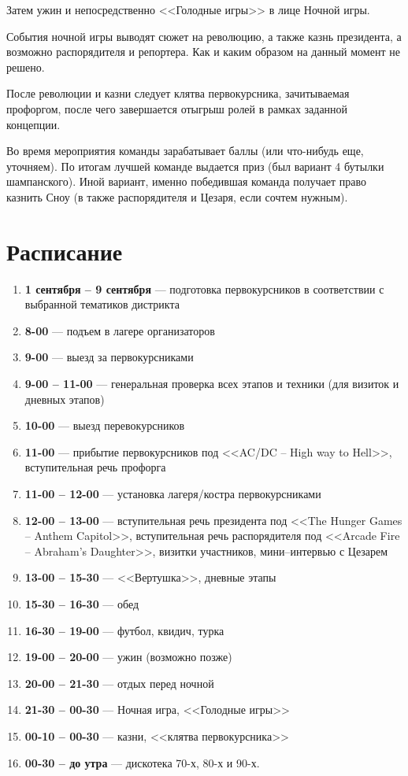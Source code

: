 \documentclass[a4paper, 14pt]{extarticle}
\theoremstyle{definition}
\begin{document}
\par Затем ужин и непосредственно <<Голодные игры>> в лице Ночной игры.

\par События ночной игры выводят сюжет на революцию, а также казнь президента, а возможно распорядителя и репортера. Как и каким образом на данный момент не решено.

\par После революции и казни следует клятва первокурсника, зачитываемая профоргом, после чего завершается отыгрыш ролей в рамках заданной концепции.

\par Во время мероприятия команды зарабатывает баллы (или что-нибудь еще, уточняем). По итогам лучшей команде выдается приз (был вариант 4 бутылки шампанского). Иной вариант, именно победившая команда получает право казнить Сноу (в также распорядителя и Цезаря, если сочтем нужным).


\section{Расписание}

\begin{enumerate}
\item \textbf{1 сентября -- 9 сентября} --- подготовка первокурсников в соответствии с выбранной тематиков дистрикта
\item \textbf{8-00} --- подъем в лагере организаторов
\item \textbf{9-00} --- выезд за первокурсниками
\item \textbf{9-00 -- 11-00} --- генеральная проверка всех этапов и техники (для визиток и дневных этапов)
\item \textbf{10-00} --- выезд перевокурсников
\item \textbf{11-00} --- прибытие первокурсников под <<AC/DC -- High way to Hell>>, вступительная речь профорга
\item \textbf{11-00 -- 12-00} --- установка лагеря/костра первокурсниками
\item \textbf{12-00 -- 13-00} --- вступительная речь президента под <<The Hunger Games -- Anthem Capitol>>, вступительная речь распорядителя под <<Arcade Fire -- Abraham's Daughter>>, визитки участников, мини--интервью с Цезарем
\item \textbf{13-00 -- 15-30} --- <<Вертушка>>, дневные этапы
\item \textbf{15-30 -- 16-30} --- обед
\item \textbf{16-30 -- 19-00} --- футбол, квидич, турка
\item \textbf{19-00 -- 20-00} --- ужин (возможно позже)
\item \textbf{20-00 -- 21-30} --- отдых перед ночной
\item \textbf{21-30 -- 00-30} --- Ночная игра, <<Голодные игры>>
\item \textbf{00-10 -- 00-30} --- казни, <<клятва первокурсника>>
\item \textbf{00-30 -- до утра} --- дискотека 70-х, 80-х и 90-х.
\end{enumerate}
\end{document}
